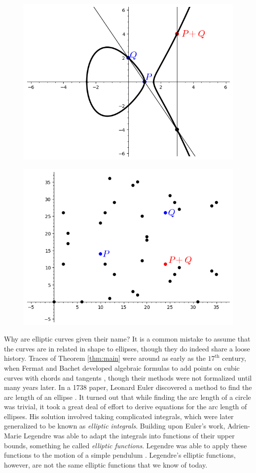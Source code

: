 \documentclass[]{math_paper}
\begin{document}
\begin{figure}[H]
    \centering
    \begin{minipage}{.5\textwidth}
        \centering
        \includegraphics[height = 2 in]{media/curve_1.png}
        \label{fig:curve1}
    \end{minipage}%
    \begin{minipage}{.5\textwidth}
        \centering
        \includegraphics[height = 2 in]{media/curve_2.png}
        \label{fig:curve2}
    \end{minipage}
\end{figure}

Why are elliptic curves given their name? It is a common mistake to assume that the curves are in related in shape to ellipses, though they do indeed share a loose history. Traces of Theorem \ref{thm:main} were around as early as the $17^{\text{th}}$ century, when Fermat and Bachet developed algebraic formulas to add points on cubic curves with chords and tangents \cite{rice}, though their methods were not formalized until many years later. In a 1738 paper, Leonard Euler discovered a method to find the arc length of an ellipse \cite{sandifer2007euler}. It turned out that while finding the arc length of a circle was trivial, it took a great deal of effort to derive equations for the arc length of ellipses. His solution involved taking complicated integrals, which were later generalized to be known as \emph{elliptic integrals}. Building upon Euler's work, Adrien-Marie Legendre was able to adapt   the integrals into functions of their upper bounds, something he called \emph{elliptic functions}. Legendre was able to apply these functions to the motion of a simple pendulum \cite{legendre}. Legendre's elliptic functions, however, are not the same elliptic functions that we know of today.
\end{document}
